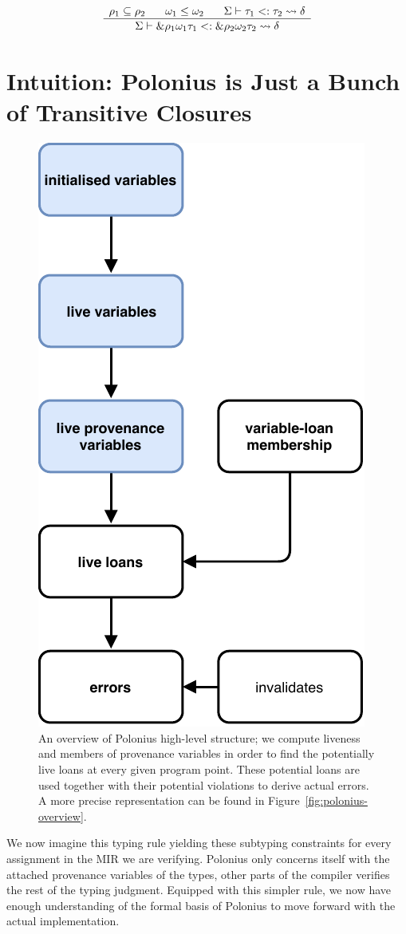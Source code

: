 \documentclass[11pt,a4paper,twoside,openany]{report}
\newcommand{\ntyperule}[2]{\begin{array}{c}#1\\\hline\raisebox{1pt}{\strut}#2\end{array}}
\begin{document}
\begin{equation}\label{eq:s-ref}
  \ntyperule{
    \rho_1 \subseteq \rho_2 \:\:\:\:\:\:\:\:
    \omega_1 \leq \omega_2 \:\:\:\:\:\:\:\:
    \Sigma \vdash \tau_1 <: \tau_2 \leadsto \delta
  }
  {
    \Sigma \vdash \&\rho_1 \omega_1 \tau_1 <: \& \rho_2 \omega_2 \tau_2 \leadsto \delta
  }
\end{equation}

\section{Intuition: Polonius is Just a Bunch of Transitive Closures}\label{sec:borrow-check-intuition}


\begin{figure}[h!]
  \includegraphics[width=0.4\linewidth]{Graphs/polonius-high-level-overview}
  \caption[Polonius High-Level Overview]{An overview of Polonius high-level
    structure; we compute liveness and members of provenance variables in order
    to find the potentially live loans at every given program point. These
    potential loans are used together with their potential violations to derive
    actual errors. A more precise representation can be found in
    Figure~\ref{fig:polonius-overview}.}
  \label{fig:polonius-high-level-overview}
\end{figure}

We now imagine this typing rule yielding these subtyping constraints for every
assignment in the MIR we are verifying. Polonius only concerns itself with the
attached provenance variables of the types, other parts of the compiler verifies
the rest of the typing judgment. Equipped with this simpler rule, we now have
enough understanding of the formal basis of Polonius to move forward with the
actual implementation.
\end{document}
